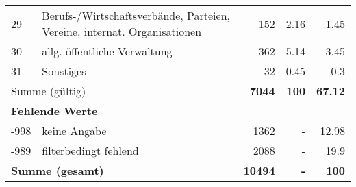 \begin{longtable}{lXrrr}
        29 & \multicolumn{1}{X}{Berufs-/Wirtschaftsverbände, Parteien, Vereine, internat. Organisationen} & %
          \num{152} &
          \num[round-mode=places,round-precision=2]{2,16} &
          \num[round-mode=places,round-precision=2]{1,45} \\

        30 & \multicolumn{1}{X}{allg. öffentliche Verwaltung} & %
          \num{362} &
          \num[round-mode=places,round-precision=2]{5,14} &
          \num[round-mode=places,round-precision=2]{3,45} \\

        31 & \multicolumn{1}{X}{Sonstiges} & %
          \num{32} &
          \num[round-mode=places,round-precision=2]{0,45} &
          \num[round-mode=places,round-precision=2]{0,3} \\

     \midrule
     \multicolumn{2}{l}{Summe (gültig)} &
       \textbf{\num{7044}} &
     \textbf{100} &
       \textbf{\num[round-mode=places,round-precision=2]{67,12}} \\
     \multicolumn{5}{l}{\textbf{Fehlende Werte}}\\
       -998 &
       keine Angabe &
         \num{1362} &
        - &
         \num[round-mode=places,round-precision=2]{12,98} \\
       -989 &
       filterbedingt fehlend &
         \num{2088} &
        - &
         \num[round-mode=places,round-precision=2]{19,9} \\
     \midrule
     \multicolumn{2}{l}{\textbf{Summe (gesamt)}} &
          \textbf{\num{10494}} &
        \textbf{-} &
        \textbf{100} \\
     \bottomrule
     \end{longtable}
     
